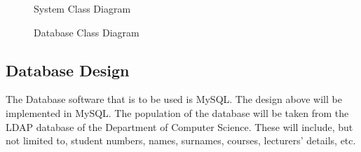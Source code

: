 \documentclass[12pt]{article}
\begin{document}
		\begin{figure}[htbp]
			\centering
			\caption{System Class Diagram}
		\end{figure}
		
		\begin{figure}[htbp]
			\centering
			\caption{Database Class Diagram}
		\end{figure}

	\vspace{0.5cm}
	\subsection{Database Design}
	
	\vspace{0.5cm}
	
		The Database software that is to be used is MySQL. The design above will be implemented in MySQL. The population of the database will be taken from the LDAP database of the Department of Computer Science. These will include, but not limited to, student numbers, names, surnames, courses, lecturers’ details, etc. 
		
\end{document}

